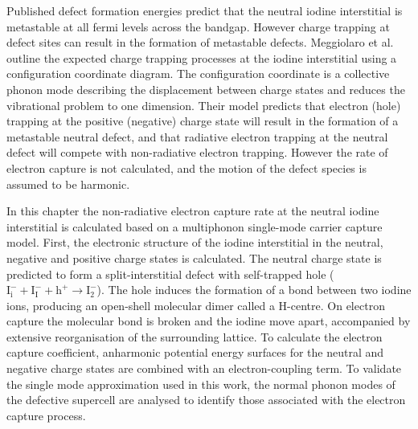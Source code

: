 Published defect formation energies predict that the neutral iodine interstitial is metastable at all fermi levels across the bandgap.\autocite{Du2015,Meggiolaro2018}
However charge trapping at defect sites can result in the formation of metastable defects.
Meggiolaro et al. outline the expected charge trapping processes at the iodine interstitial using a configuration coordinate diagram.\autocite{Meggiolaro2018}
The configuration coordinate is a collective phonon mode describing the displacement between charge states and reduces the vibrational problem to one dimension.
Their model predicts that electron (hole) trapping at the positive (negative) charge state will result in the formation of a metastable neutral defect, and that radiative electron trapping at the neutral defect will compete with non-radiative electron trapping.
However the rate of electron capture is not calculated, and the motion of the defect species is assumed to be harmonic.

In this chapter the non-radiative electron capture rate at the neutral iodine interstitial is calculated based on a multiphonon single-mode carrier capture model.  %
First, the electronic structure of the iodine interstitial in the neutral, negative and positive charge states is calculated. The neutral charge state is predicted to form a split-interstitial defect with self-trapped hole ($\mathrm{I}_\mathrm{i}^-+\mathrm{I}_\mathrm{I}^-+\mathrm{h}^+ \rightarrow \mathrm{I}_\mathrm{2}^-$). The hole induces the formation of a bond between two iodine ions, producing an open-shell molecular dimer called a H-centre.\autocite{Castner1957} On electron capture the molecular bond is broken and the iodine move apart, accompanied by extensive reorganisation of the surrounding lattice. 
To calculate the electron capture coefficient, anharmonic potential energy surfaces for the neutral and negative charge states are combined with an electron-coupling term.
To validate the single mode approximation used in this work, the normal phonon modes of the defective supercell are analysed to identify those associated with the electron capture process.




